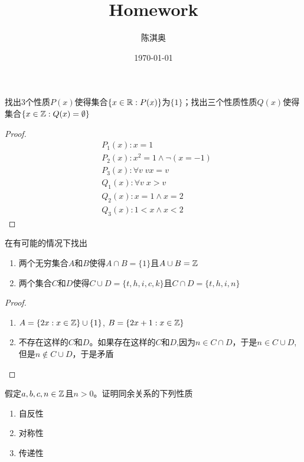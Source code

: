 \documentclass[11pt]{article}
\author{陈淇奥}
\date{\today}
\title{Homework}
\begin{document}
\maketitle
\begin{exercise}[1.2.3]
找出3个性质\(P(x)\)使得集合\(\{x\in\mathbb{R}:P(x)\}\)为\(\{1\}\)；找出三个性质性质\(Q(x)\)使得集合\(\{x\in\mathbb{Z}:Q(x)=\emptyset\}\)
\end{exercise}

\begin{proof}
\begin{align*}
&P_1(x):x=1\\
&P_2(x):x^2=1\wedge \neg(x=-1) \\
&P_3(x):\forall v\;vx=v\\
&Q_1(x):\forall v\;x>v\\
&Q_2(x):x=1\wedge x=2\\
&Q_3(x):1<x\wedge x<2
\end{align*}
\end{proof}

\begin{exercise}[1.2.4]
在有可能的情况下找出
\begin{enumerate}
\item 两个无穷集合\(A\)和\(B\)使得\(A\cap B=\{1\}\)且\(A\cup B=\mathbb{Z}\)
\item 两个集合\(C\)和\(D\)使得\(C\cup D=\{t,h,i,c,k\}\)且\(C\cap D=\{t,h,i,n\}\)
\end{enumerate}
\end{exercise}

\begin{proof}
\begin{enumerate}
\item \(A=\{2x:x\in\mathbb{Z}\}\cup\{1\}\), \(B=\{2x+1:x\in\mathbb{Z}\}\)
\item 不存在这样的\(C\)和\(D\)。如果存在这样的\(C\)和\(D\),因为\(n\in C\cap D\)，于是\(n\in C\cup D\),但是\(n\notin C\cup D\)，于是矛盾
\end{enumerate}
\end{proof}

\begin{exercise}[1.3.2]
假定\(a,b,c,n\in\mathbb{Z}\)且\(n>0\)。证明同余关系的下列性质
\begin{enumerate}
\item 自反性
\item 对称性
\item 传递性
\end{enumerate}
\end{exercise}
\end{document}

